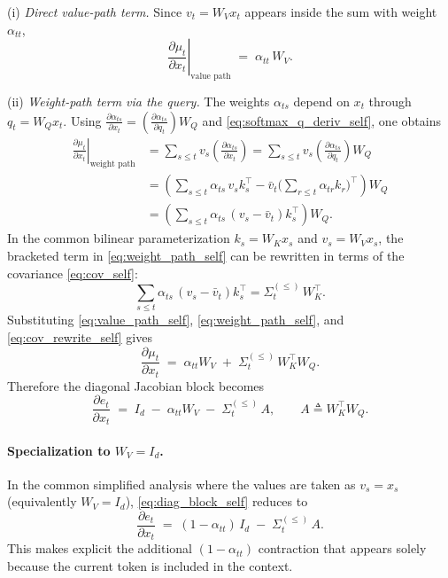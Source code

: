 \documentclass[11pt]{article}
\begin{document}
\smallskip
\noindent
(i) \emph{Direct value-path term.} Since $v_t=W_Vx_t$ appears inside the sum with weight $\alpha_{tt}$,
\begin{equation}
\left.\frac{\partial \mu_t}{\partial x_t}\right|_{\text{value path}}
\;=\;
\alpha_{tt}\,W_V.
\label{eq:value_path_self}
\end{equation}

\smallskip
\noindent
(ii) \emph{Weight-path term via the query.} The weights $\alpha_{ts}$ depend on $x_t$ through $q_t=W_Qx_t$. Using
$\frac{\partial \alpha_{ts}}{\partial x_t}
=
\left(\frac{\partial \alpha_{ts}}{\partial q_t}\right) W_Q$
and \eqref{eq:softmax_q_deriv_self}, one obtains
\begin{align}
\left.\frac{\partial \mu_t}{\partial x_t}\right|_{\text{weight path}}
&=
\sum_{s\le t} v_s \left(\frac{\partial \alpha_{ts}}{\partial x_t}\right)
=
\sum_{s\le t} v_s \left(\frac{\partial \alpha_{ts}}{\partial q_t}\right) W_Q \nonumber\\
&=
\left(\sum_{s\le t}\alpha_{ts}\,v_s k_s^\top - \bar v_t \Big(\sum_{r\le t}\alpha_{tr}k_r\Big)^\top \right) W_Q \nonumber\\
&=
\left(\sum_{s\le t}\alpha_{ts}\,(v_s-\bar v_t)k_s^\top\right) W_Q.
\label{eq:weight_path_self}
\end{align}
In the common bilinear parameterization $k_s=W_Kx_s$ and $v_s=W_Vx_s$, the bracketed term in \eqref{eq:weight_path_self} can be rewritten in terms of the covariance \eqref{eq:cov_self}:
\begin{equation}
\sum_{s\le t}\alpha_{ts}\,(v_s-\bar v_t)k_s^\top
=
\Sigma_t^{(\le)}\,W_K^\top.
\label{eq:cov_rewrite_self}
\end{equation}
Substituting \eqref{eq:value_path_self}, \eqref{eq:weight_path_self}, and \eqref{eq:cov_rewrite_self} gives
\begin{equation}
\frac{\partial \mu_t}{\partial x_t}
\;=\;
\alpha_{tt} W_V \;+\; \Sigma_t^{(\le)}\,W_K^\top W_Q.
\label{eq:dmu_dxt_self}
\end{equation}
Therefore the diagonal Jacobian block becomes
\begin{equation}
\boxed{
\frac{\partial e_t}{\partial x_t}
\;=\;
I_d \;-\; \alpha_{tt} W_V \;-\; \Sigma_t^{(\le)}\,A,
\qquad
A \triangleq W_K^\top W_Q.
}
\label{eq:diag_block_self}
\end{equation}

\paragraph{Specialization to $W_V=I_d$.}
In the common simplified analysis where the values are taken as $v_s=x_s$ (equivalently $W_V=I_d$), \eqref{eq:diag_block_self} reduces to
\begin{equation}
\frac{\partial e_t}{\partial x_t}
\;=\;
(1-\alpha_{tt})\,I_d \;-\; \Sigma_t^{(\le)}\,A.
\label{eq:diag_block_self_WV_I}
\end{equation}
This makes explicit the additional $(1-\alpha_{tt})$ contraction that appears solely because the current token is included in the context.
\end{document}
